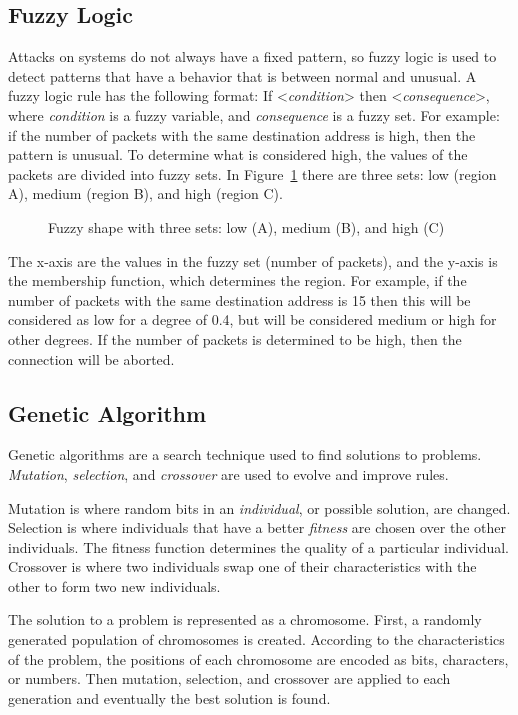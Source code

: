 \documentclass{sig-alternate}
\begin{document}
\subsection{Fuzzy Logic}
\label{sec:fuzzyLogic}
Attacks on systems do not always have a fixed pattern, so fuzzy logic is used to detect patterns that have a behavior that is between normal and unusual. A fuzzy logic rule has the following format: If <\emph{condition}> then <\emph{consequence}>, where \emph{condition} is a fuzzy variable, and \emph{consequence} is a fuzzy set. For example: if the number of packets with the same destination address is high, then the pattern is unusual. To determine what is considered high, the values of the packets are divided into fuzzy sets. In Figure~\ref{fig:triangleFigure} there are three sets: low (region A), medium (region B), and high (region C). 
\begin{figure}
\centering
{}
\caption{Fuzzy shape with three sets: low (A), medium (B), and high (C)~\cite{DBLP:journals/corr/abs-1204-6416}}
\label{fig:triangleFigure}
\end{figure}
The x-axis are the values in the fuzzy set (number of packets), and the y-axis is the membership function, which determines the region. For example, if the number of packets with the same destination address is 15 then this will be considered as low for a degree of 0.4, but will be considered medium or high for other degrees. If the number of packets is determined to be high, then the connection will be aborted.~\cite{DBLP:journals/corr/abs-1204-6416}




\subsection{Genetic Algorithm}
\label{sec:GA}
Genetic algorithms are a search technique used to find solutions to problems. \emph{Mutation}, \emph{selection}, and \emph{crossover} are used to evolve and improve rules.

Mutation is where random bits in an \emph{individual}, or possible solution, are changed. Selection is where individuals that have a better \emph{fitness} are chosen over the other individuals. The fitness function determines the quality of a particular individual. Crossover is where two individuals swap one of their characteristics with the other to form two new individuals.

The solution to a problem is represented as a chromosome. First, a randomly generated population of chromosomes is created. According to the characteristics of the problem, the positions of each chromosome are encoded as bits, characters, or numbers. Then mutation, selection, and crossover are applied to each generation and eventually the best solution is found.~\cite{DBLP:journals/corr/abs-1204-6416}
\end{document}
